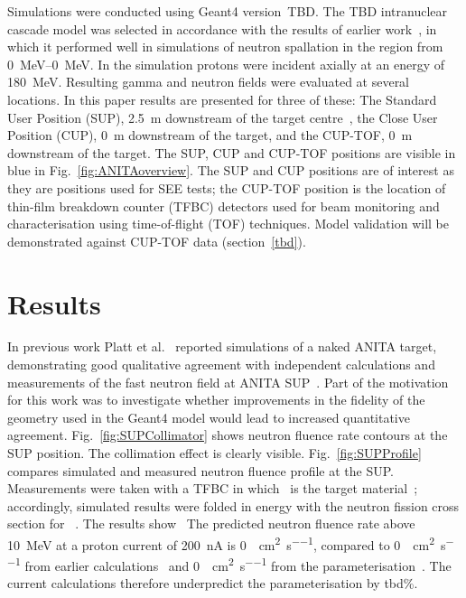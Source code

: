 \documentclass[12pt,journal]{IEEEtran}
\def\U238{\BPChem{\^{238}U}}
\begin{document}
Simulations were conducted using Geant4 version~TBD.
The TBD intranuclear cascade model was selected in accordance with the results of earlier work~\cite{Platt13}, in which it performed well in simulations of neutron spallation in the region from \SIrange{0}{0}{\MeV}.
In the simulation protons were incident axially at an energy of \SI{180}{\MeV}.
Resulting gamma and neutron fields were evaluated at several locations.
In this paper results are presented for three of these: The Standard User Position (SUP), \SI{2.5}{\m} downstream of the target centre~\cite{Prokofiev2009}, the Close User Position (CUP), \SI{0}{\m} downstream of the target, and the CUP-TOF, \SI{0}{m} downstream of the target.
The SUP, CUP and CUP-TOF positions are visible in blue in Fig.~\ref{fig:ANITAoverview}.
The SUP and CUP positions are of interest as they are positions used for SEE tests; the CUP-TOF position is the location of thin-film breakdown counter (TFBC) detectors used for beam monitoring and characterisation using time-of-flight (TOF) techniques.
Model validation will be demonstrated against CUP-TOF data (section~\ref{tbd}).

\section{Results}

In previous work Platt et al.~\cite{Platt13} reported simulations of a naked ANITA target, demonstrating good qualitative agreement with independent calculations and measurements of the fast neutron field at ANITA SUP~\cite{Prokofiev2009}.
Part of the motivation for this work was to investigate whether improvements in the fidelity of the geometry used in the Geant4 model would lead to increased quantitative agreement.
Fig.~\ref{fig:SUPCollimator} shows neutron fluence rate contours at the SUP position.
The collimation effect is clearly visible.
Fig.~\ref{fig:SUPProfile} compares simulated and measured neutron fluence profile at the SUP.
Measurements were taken with a TFBC in which \U238\ is the target material~\cite{Prokofiev2009}; accordingly, simulated results were folded in energy with the neutron fission cross section for \U238~\cite{tbd}.
The results show~
The predicted neutron fluence rate above \SI{10}{\MeV} at a proton current of \SI{200}{\nA} is \SI{0}{\neutron\per\cm\squared\per\second}, compared to \SI{0}{\neutron\per\cm\squared\per\second} from earlier calculations~\cite{Platt13} and \SI{0}{\neutron\per\cm\squared\per\second} from the parameterisation~\cite{Prokofiev2009}.
The current calculations therefore underpredict the parameterisation by tbd\%.
\end{document}
